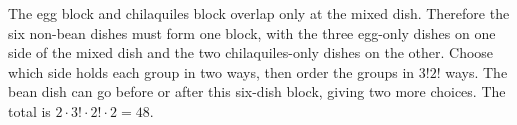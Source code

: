 The egg block and chilaquiles block overlap only at the mixed dish. Therefore the six non-bean dishes must form one block, with the three egg-only dishes on one side of the mixed dish and the two chilaquiles-only dishes on the other. Choose which side holds each group in two ways, then order the groups in $3!2!$ ways. The bean dish can go before or after this six-dish block, giving two more choices. The total is $\boxed{2\cdot3!\cdot2!\cdot2=48}$.
